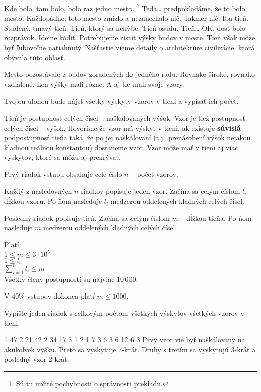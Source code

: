 





Kde bolo, tam bolo, bolo raz jedno mesto.
\footnote{Sú tu určité pochybnosti o správnosti prekladu.}
Teda\dots{} predpokladáme, že to bolo mesto.
Každopádne, toto mesto zmizlo a nezanechalo nič.
Takmer nič. Iba tieň. Studený, tmavý tieň.
Tieň, ktorý sa nehýbe. Tieň osudu.
Tieň\dots{} OK, dosť bolo rozprávok.
Ideme kódiť.
Potrebujeme zistiť výšky budov v meste.
Tieň však môže byť ľubovoľne natiahnutý.
Našťastie vieme detaily o architektúre civilizácie,
ktorá obývala túto oblasť.

Mesto pozostávalo z budov zoradených do jedného radu.
Rovnako široké, rovnako vzdialené. Len výšky mali rôzne.
A aj tie mali svoje vzory.

Tvojou úlohou bude nájsť všetky výskyty vzorov v tieni
a vypísať ich počet.



Tieň je postupnosť celých čísel -- naškálovaných výšok.
Vzor je tiež postupnosť celých čísel -- výšok.
Hovoríme že vzor má výskyt v tieni,
ak existuje \textbf{súvislá} podpostupnosť tieňa taká,
že po jej naškálovaní (t.j.\ prenásobení výšok nejakou kladnou reálnou konštantou) dostaneme vzor.
Vzor môže mať v tieni aj viac výskytov, ktoré sa môžu aj prekrývať.



Prvý riadok vstupu obsahuje celé číslo $n$
-- počet vzorov.

Každý z nasledovných $n$ riadkov popisuje jeden vzor.
Začína sa celým číslom $l_i$ -- dĺžkou vzoru.
Po ňom nasleduje $l_i$ medzerou oddelených kladných celých čísel.

Posledný riadok popisuje tieň.
Začína sa celým číslom $m$ -- dĺžkou tieňa.
Po ňom nasleduje $m$ medzerou oddelených kladných celých čísel.

\bigskip

Platí:\\
$1 \leq m \leq 3\cdot10^5$\\
$1 \leq l_i$\\
$\sum^{n}_{i=1} l_i \leq m$\\
Všetky členy postupností su najviac $10\,000$.

\smallskip

V $40\%$ vstupov dokonca platí $m \leq 1000$.


Vypíšte jeden riadok s celkovým počtom všetkých výskytov
všetkých vzorov v tieni.



1 47
2 21 42
2 34 17
3 1 2 1
7 3 6 3 6 12 6 3
\sampleCOMMENT
Prvý vzor vie byť naškálovaný na akúkoľvek výšku.
Preto sa vyskytuje 7-krát. Druhý s tretím sa
vyskytujú 3-krát a posledný vzor 2-krát.
\sampleEND



